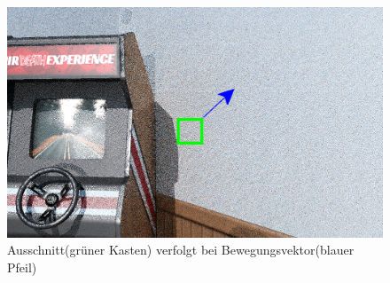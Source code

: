   \begin{figure}[H]
    \begin{tcolorbox}
    \centering
    \includegraphics[width=0.6\linewidth]{content/TemporalerAlg/Bilder/Reprojection/Szene_bearbeitet.png}
    \end{tcolorbox}
    \caption{Ausschnitt(grüner Kasten) verfolgt bei Bewegungsvektor(blauer Pfeil)}
    \label{pic:TemporalReprComparison}
  \end{figure}


